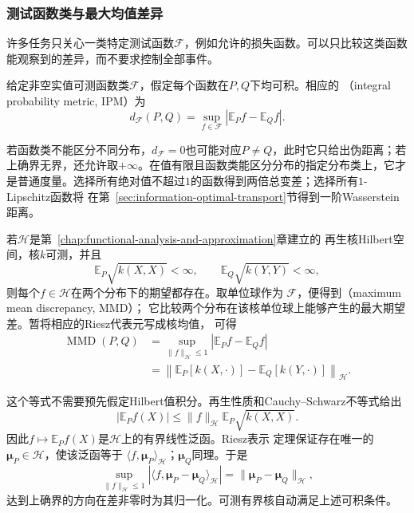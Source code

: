 \subsubsection{测试函数类与最大均值差异}
许多任务只关心一类特定测试函数\(\mathcal{F}\)，例如允许的损失函数。可以只比较这类函数能观察到的差异，而不要求控制全部事件。
\begin{definition}[积分概率度量]
  \label{def:information-ipm}
  给定非空实值可测函数类\(\mathcal F\)，假定每个函数在\(P,Q\)下均可积。相应的
（integral probability metric, IPM）为
\begin{equation}
  d_{\mathcal{F}}(P,Q)
  =
  \sup_{f\in\mathcal{F}}
  |\mathbb{E}_P f-\mathbb{E}_Q f|.
  \label{eq:information-ipm}
\end{equation}
\end{definition}
若函数类不能区分不同分布，\(d_{\mathcal F}=0\)也可能对应\(P\neq Q\)，此时它只给出伪距离；若上确界无界，还允许取\(+\infty\)。在值有限且函数类能区分分布的指定分布类上，它才是普通度量。选择所有绝对值不超过\(1\)的函数得到两倍总变差；选择所有\(1\)-Lipschitz函数将
在第~\ref{sec:information-optimal-transport}节得到一阶Wasserstein距离。
\begin{definition}[最大均值差异]
  \label{def:information-mmd}
若\(\mathcal{H}\)是第~\ref{chap:functional-analysis-and-approximation}章建立的
再生核Hilbert空间，核\(k\)可测，并且
\[
  \mathbb{E}_{P}\sqrt{k(X,X)}<\infty,
  \qquad
  \mathbb{E}_{Q}\sqrt{k(Y,Y)}<\infty,
\]
则每个\(f\in\mathcal H\)在两个分布下的期望都存在。取单位球作为
\(\mathcal{F}\)，便得到（maximum mean discrepancy, MMD）；
它比较两个分布在该核单位球上能够产生的最大期望差。暂将相应的Riesz代表元写成核均值，
可得
\[
\begin{aligned}
  \operatorname{MMD}(P,Q)
  &=
  \sup_{\lVert f\rVert_{\mathcal{H}}\leq1}
  |\mathbb{E}_P f-\mathbb{E}_Q f|\\
  &=
  \left\lVert
    \mathbb{E}_P[k(X,\cdot)]
    -
    \mathbb{E}_Q[k(Y,\cdot)]
  \right\rVert_{\mathcal{H}}.
\end{aligned}
\]
\end{definition}
这个等式不需要预先假定Hilbert值积分。再生性质和Cauchy--Schwarz不等式给出
\[
  |\mathbb{E}_P f(X)|
  \leq
  \lVert f\rVert_{\mathcal H}
  \mathbb{E}_P\sqrt{k(X,X)}.
\]
因此\(f\mapsto\mathbb{E}_P f(X)\)是\(\mathcal H\)上的有界线性泛函。Riesz表示
定理保证存在唯一的\(\bm{\mu}_P\in\mathcal H\)，使该泛函等于
\(\langle f,\bm{\mu}_P\rangle_{\mathcal H}\)；\(\bm{\mu}_Q\)同理。于是
\[
  \sup_{\lVert f\rVert_{\mathcal H}\leq1}
  |\langle f,\bm{\mu}_P-\bm{\mu}_Q\rangle_{\mathcal H}|
  =
  \lVert\bm{\mu}_P-\bm{\mu}_Q\rVert_{\mathcal H},
\]
达到上确界的方向在差非零时为其归一化。可测有界核自动满足上述可积条件。

